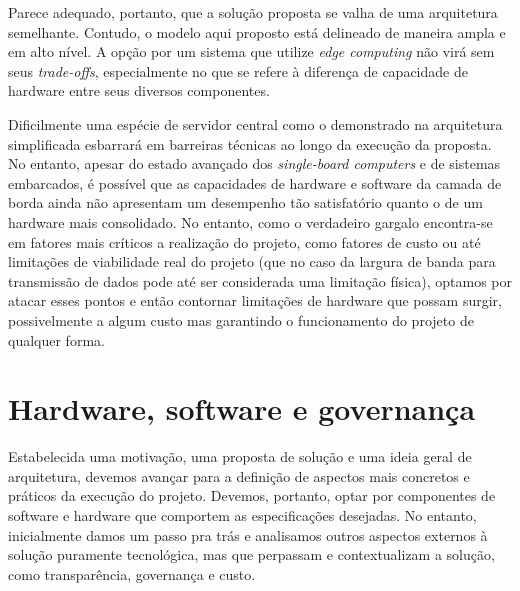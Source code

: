 \documentclass[]{politex}
\begin{document}
Parece adequado, portanto, que a solução proposta se valha de uma arquitetura semelhante. Contudo, o modelo aqui proposto está delineado de maneira ampla e em alto nível. A opção por um sistema que utilize \textit{edge computing} não virá sem seus \textit{trade-offs}, especialmente no que se refere à diferença de capacidade de hardware entre seus diversos componentes.

Dificilmente uma espécie de servidor central como o demonstrado na arquitetura simplificada esbarrará em barreiras técnicas ao longo da execução da proposta. No entanto, apesar do estado avançado dos \textit{single-board computers} e de sistemas embarcados, é possível que as capacidades de hardware e software da camada de borda ainda não apresentam um desempenho tão satisfatório quanto o de um hardware mais consolidado. No entanto, como o verdadeiro gargalo encontra-se em fatores mais críticos a realização do projeto, como fatores de custo ou até limitações de viabilidade real do projeto (que no caso da largura de banda para transmissão de dados pode até ser considerada uma limitação física), optamos por atacar esses pontos e então contornar limitações de hardware que possam surgir, possivelmente a algum custo mas garantindo o funcionamento do projeto de qualquer forma.

\section{Hardware, software e governança}

Estabelecida uma motivação, uma proposta de solução e uma ideia geral de arquitetura, devemos avançar para a definição de aspectos mais concretos e práticos da execução do projeto. Devemos, portanto, optar por componentes de software e hardware que comportem as especificações desejadas. No entanto, inicialmente damos um passo pra trás e analisamos outros aspectos externos à solução puramente tecnológica, mas que perpassam e contextualizam a solução, como transparência, governança e custo.
\end{document}
